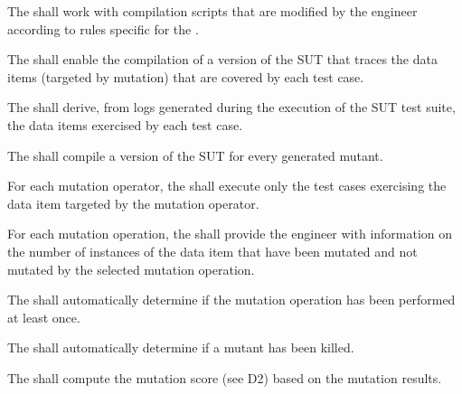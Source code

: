 

\RQ{} The \FAQAS shall work with compilation scripts that are modified by the engineer according to rules specific for the \FAQAS.

\RQ{} The \FAQAS shall enable the compilation of a version of the SUT that traces the data items (targeted by mutation) that are covered by each test case.

\RQ{} The \FAQAS shall derive, from logs generated during the execution of the SUT test suite, the data items exercised by each test case.

\RQ{} The \FAQAS shall compile a version of the SUT for every generated mutant.

\RQ{} For each mutation operator, the \FAQAS shall execute only the test cases exercising the data item targeted by the mutation operator.

\RQ{} For each mutation operation, the \FAQAS shall provide the engineer with information on the number of instances of the data item that have been mutated and not mutated by the selected mutation operation.

\RQ{} The \FAQAS shall automatically determine if the mutation operation has been performed at least once.

\RQ{} The \FAQAS shall automatically determine if a mutant has been killed.

\RQ{} The \FAQAS shall compute the mutation score (see D2) based on the mutation results.

